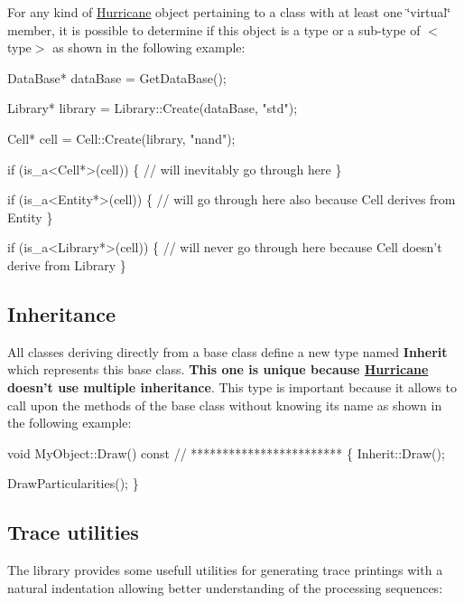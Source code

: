 For any kind of \hyperlink{namespaceHurricane}{Hurricane} object pertaining to a class with at least one \char`\"{}virtual\char`\"{} member, it is possible to determine if this object is a type or a sub-\/type of {\ttfamily $<$type$>$} as shown in the following example\-: 
\begin{DoxyCode}
DataBase* dataBase = GetDataBase();
 
Library* library = Library::Create(dataBase, \textcolor{stringliteral}{"std"});
 
Cell* cell = Cell::Create(library, \textcolor{stringliteral}{"nand"});
 
\textcolor{keywordflow}{if} (is\_a<Cell*>(cell)) \{
   \textcolor{comment}{// will inevitably go through here}
\}
 
\textcolor{keywordflow}{if} (is\_a<Entity*>(cell)) \{
   \textcolor{comment}{// will go through here also because Cell derives from Entity}
\}
 
\textcolor{keywordflow}{if} (is\_a<Library*>(cell)) \{
   \textcolor{comment}{// will never go through here because Cell doesn't derive from Library}
\}
\end{DoxyCode}
\hypertarget{group__Generalities_secGeneralitiesInheritance}{}\subsection{Inheritance}\label{group__Generalities_secGeneralitiesInheritance}
All classes deriving directly from a base class define a new type named {\bfseries Inherit} which represents this base class. {\bfseries This one is unique because \hyperlink{namespaceHurricane}{Hurricane} doesn't use multiple inheritance}. This type is important because it allows to call upon the methods of the base class without knowing its name as shown in the following example\-: 
\begin{DoxyCode}
\textcolor{keywordtype}{void} MyObject::Draw() const
\textcolor{comment}{// ************************}
\{
   Inherit::Draw();
 
   DrawParticularities();
\}
\end{DoxyCode}
\hypertarget{group__Generalities_secGeneralitiesTraceUtilities}{}\subsection{Trace utilities}\label{group__Generalities_secGeneralitiesTraceUtilities}
The library provides some usefull utilities for generating trace printings with a natural indentation allowing better understanding of the processing sequences\-:


